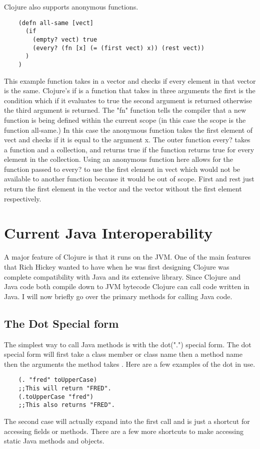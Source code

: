 \documentclass[12pt]{article}
\begin{document}
	Clojure also supports anonymous functions. 
	\begin{verbatim}
	(defn all-same [vect]
      (if 
        (empty? vect) true
        (every? (fn [x] (= (first vect) x)) (rest vect)) 
      )
    )
	\end{verbatim}
	This example function takes in a vector and checks if every element in that vector is the same. Clojure's if is a function that takes in three arguments the first is the condition which if it evaluates to true the second argument is returned otherwise the third argument is returned. The "fn" function tells the compiler that a new function is being defined within the current scope (in this case the scope is the function all-same.) In this case the anonymous function takes the first element of vect and checks if it is equal to the argument x. The outer function every? takes a function and a collection, and returns true if the function returns true for every element in the collection. Using an anonymous function here allows for the function passed to every? to use the first element in vect which would not be available to another function because it would be out of scope. First and rest just return the first element in the vector and the vector without the first element respectively.

\section{Current Java Interoperability}\label{sec:bg}
	A major feature of Clojure is that it runs on the JVM. One of the main features that Rich Hickey wanted to have when he was first designing Clojure was complete compatibility with Java and its extensive library. Since Clojure and Java code both compile down to JVM bytecode Clojure can call code written in Java. I will now briefly go over the primary methods for calling Java code.
	
	\subsection{The Dot Special form}
	The simplest way to call Java methods is with the dot(".") special form. The dot special form will first take a class member or class name then a method name then the arguments the method takes \cite{cloj:interop}. Here are a few examples of the dot in use.
	\begin{verbatim}
	(. "fred" toUpperCase)
	;;This will return "FRED".
	(.toUpperCase "fred")
	;;This also returns "FRED".
	\end{verbatim}
	The second case will actually expand into the first call and is just a shortcut for accessing fields or methods. There are a few more shortcuts to make accessing static Java methods and objects.
	
\end{document}
